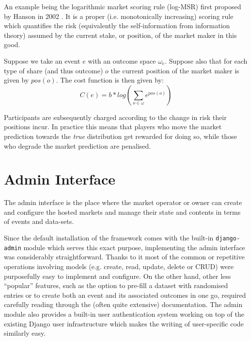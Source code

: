 \documentclass[bsc,frontabs,twoside,singlespacing,parskip,deptreport]{infthesis}     %
\begin{document}
	An example being the logarithmic market scoring rule (log-MSR) first proposed by Hanson in 2002 \cite{hanson_logarithmic_2002}. It is a proper (i.e. monotonically increasing) scoring rule which quantifies the risk (equivalently the self-information from information theory) assumed by the current stake, or position, of the market maker in this good. 

	Suppose we take an event $e$ with an outcome space $\omega_e$. Suppose also that for each type of share (and thus outcome) $o$ the current position of the market maker is given by $pos(o)$. The cost function is then given by:
$$C(e)=b*log(\sum_{o \in \omega} {e^{pos(o)}})$$

	Participants are subsequently charged according to the change in risk their positions incur. In practice this means that players who move the market prediction towards the {\it true} distribution get rewarded for doing so, while those who degrade the market prediction are penalised.



\section{Admin Interface}


    The admin interface is the place where the market operator or owner can create and configure the hosted markets and manage their state and contents in terms of events and data-sets.

    Since the default installation of the framework comes with the built-in {\tt django-admin} module which serves this exact purpose, implementing the admin interface was considerably straightforward. Thanks to it most of the common or repetitive operations involving models (e.g. create, read, update, delete or CRUD) were purposefully easy to implement and configure. On the other hand, other less ``popular'' features, such as the option to pre-fill a dataset with randomised entries or to create both an event and its associated outcomes in one go, required carefully reading through the (often quite extensive) documentation. The admin module also provides a built-in user authentication system working on top of the existing Django user infrastructure which makes the writing of user-specific code similarly easy. 
\end{document}
